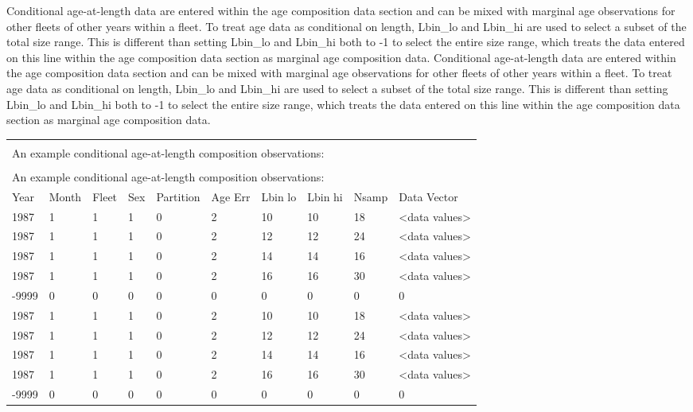 Conditional age-at-length data are entered within the age composition data section and can be mixed with marginal age observations for other fleets of other years within a fleet. To treat age data as conditional on length, Lbin\_lo and Lbin\_hi are used to select a subset of the total size range. This is different than setting Lbin\_lo and Lbin\_hi both to -1 to select the entire size range, which treats the data entered on this line within the age composition data section as marginal age composition data. 
Conditional age-at-length data are entered within the age composition data section and can be mixed with marginal age observations for other fleets of other years within a fleet. To treat age data as conditional on length, Lbin\_lo and Lbin\_hi are used to select a subset of the total size range. This is different than setting Lbin\_lo and Lbin\_hi both to -1 to select the entire size range, which treats the data entered on this line within the age composition data section as marginal age composition data. 

\vspace*{-\baselineskip}
\vspace*{-\baselineskip}
\begin{tabular}{p{0.9cm} p{1cm} p{0.9cm} p{0.9cm} p{1.5cm} p{0.9cm} p{0.9cm} p{0.9cm} p{1cm} p{2.4cm}}
	\multicolumn{10}{l}{} \\
	\multicolumn{10}{l}{An example conditional age-at-length composition observations:} \\
	\multicolumn{10}{l}{} \\
	\multicolumn{10}{l}{An example conditional age-at-length composition observations:} \\
	\hline
	Year & Month & Fleet & Sex & Partition & Age Err & Lbin lo & Lbin hi & Nsamp & Data Vector \Tstrut\\
	\hline
	1987 & 1 & 1 & 1 & 0 & 2 & 10 & 10 & 18 & <data values> \Tstrut\\
	1987 & 1 & 1 & 1 & 0 & 2 & 12 & 12 & 24 & <data values> \Tstrut\\
	1987 & 1 & 1 & 1 & 0 & 2 & 14 & 14 & 16 & <data values> \Tstrut\\
	1987 & 1 & 1 & 1 & 0 & 2 & 16 & 16 & 30 & <data values> \Tstrut\\
	-9999 & 0 & 0 & 0 & 0 & 0 & 0 & 0 & 0 & 0 \Bstrut\\
	1987 & 1 & 1 & 1 & 0 & 2 & 10 & 10 & 18 & <data values> \Tstrut\\
	1987 & 1 & 1 & 1 & 0 & 2 & 12 & 12 & 24 & <data values> \Tstrut\\
	1987 & 1 & 1 & 1 & 0 & 2 & 14 & 14 & 16 & <data values> \Tstrut\\
	1987 & 1 & 1 & 1 & 0 & 2 & 16 & 16 & 30 & <data values> \Tstrut\\
	-9999 & 0 & 0 & 0 & 0 & 0 & 0 & 0 & 0 & 0 \Bstrut\\
	\hline
\end{tabular}

